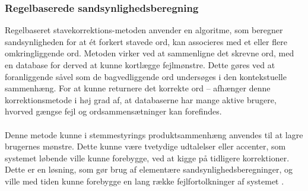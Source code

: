 \subsubsection{Regelbaserede sandsynlighedsberegning} %
Regelbaseret stavekorrektions-metoden anvender en algoritme, som beregner sandsynligheden for at ét forkert stavede ord, kan associeres med et eller flere omkringliggende ord. Metoden virker ved at sammenligne det skrevne ord, med en database for derved at kunne kortlægge fejlmønstre. Dette gøres ved at foranliggende såvel som de bagvedliggende ord undersøges i den kontekstuelle sammenhæng. For at kunne returnere det korrekte ord – afhænger denne korrektionsmetode i høj grad af, at databaserne har mange aktive brugere, hvorved gængse fejl og ordsammensætninger kan forefindes. \\\\
Denne metode kunne i stemmestyrings produktsammenhæng anvendes til at lagre brugernes mønstre. Dette kunne være tvetydige udtalelser eller accenter, som systemet løbende ville kunne forebygge, ved at kigge på tidligere korrektioner. Dette er en løsning, som gør brug af elementære sandsynlighedsberegninger, og ville med tiden kunne forebygge en lang række fejlfortolkninger af systemet \cite{UnifiedSpellCheck}. 


